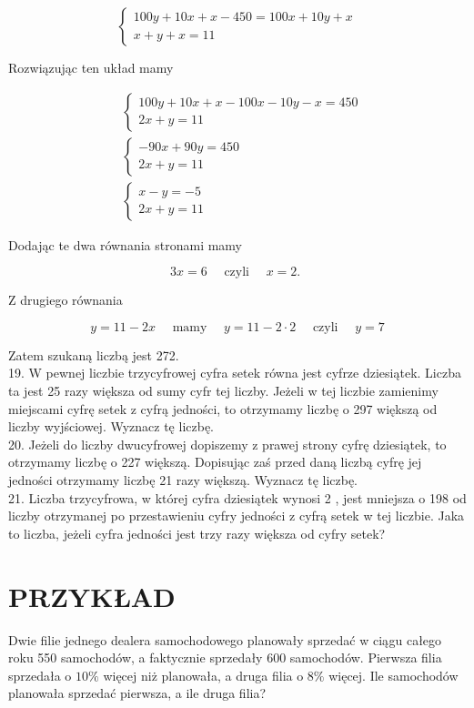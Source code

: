 \documentclass[10pt]{article}
\begin{document}
\[
\left\{\begin{array}{l}
100 y+10 x+x-450=100 x+10 y+x \\
x+y+x=11
\end{array}\right.
\]

Rozwiązując ten układ mamy

\[
\begin{aligned}
& \left\{\begin{array}{l}
100 y+10 x+x-100 x-10 y-x=450 \\
2 x+y=11
\end{array}\right. \\
& \left\{\begin{array}{l}
-90 x+90 y=450 \\
2 x+y=11
\end{array}\right. \\
& \left\{\begin{array}{l}
x-y=-5 \\
2 x+y=11
\end{array}\right.
\end{aligned}
\]

Dodając te dwa równania stronami mamy

\[
3 x=6 \quad \text { czyli } \quad x=2 \text {. }
\]

Z drugiego równania

\[
y=11-2 x \quad \text { mamy } \quad y=11-2 \cdot 2 \quad \text { czyli } \quad y=7
\]

Zatem szukaną liczbą jest 272.\\
19. W pewnej liczbie trzycyfrowej cyfra setek równa jest cyfrze dziesiątek. Liczba ta jest 25 razy większa od sumy cyfr tej liczby. Jeżeli w tej liczbie zamienimy miejscami cyfrę setek z cyfrą jedności, to otrzymamy liczbę o 297 większą od liczby wyjściowej. Wyznacz tę liczbę.\\
20. Jeżeli do liczby dwucyfrowej dopiszemy z prawej strony cyfrę dziesiątek, to otrzymamy liczbę o 227 większą. Dopisując zaś przed daną liczbą cyfrę jej jedności otrzymamy liczbę 21 razy większą. Wyznacz tę liczbę.\\
21. Liczba trzycyfrowa, w której cyfra dziesiątek wynosi 2 , jest mniejsza o 198 od liczby otrzymanej po przestawieniu cyfry jedności z cyfrą setek w tej liczbie. Jaka to liczba, jeżeli cyfra jedności jest trzy razy większa od cyfry setek?

\section*{PRZYKŁAD}
Dwie filie jednego dealera samochodowego planowały sprzedać w ciągu całego roku 550 samochodów, a faktycznie sprzedały 600 samochodów. Pierwsza filia sprzedała o \(10 \%\) więcej niż planowała, a druga filia o \(8 \%\) więcej. Ile samochodów planowała sprzedać pierwsza, a ile druga filia?
\end{document}
